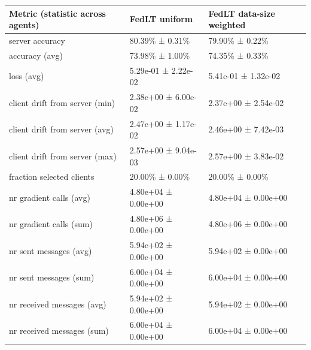 \begin{tabular}{lll}
\hline
 Metric (statistic across agents)   & FedLT uniform       & FedLT data-size weighted   \\
\hline
 server accuracy                    & 80.39\% ± 0.31\%      & 79.90\% ± 0.22\%             \\
 accuracy (avg)                     & 73.98\% ± 1.00\%      & 74.35\% ± 0.33\%             \\
 loss (avg)                         & 5.29e-01 ± 2.22e-02 & 5.41e-01 ± 1.32e-02        \\
 client drift from server (min)     & 2.38e+00 ± 6.00e-02 & 2.37e+00 ± 2.54e-02        \\
 client drift from server (avg)     & 2.47e+00 ± 1.17e-02 & 2.46e+00 ± 7.42e-03        \\
 client drift from server (max)     & 2.57e+00 ± 9.04e-03 & 2.57e+00 ± 3.83e-02        \\
 fraction selected clients          & 20.00\% ± 0.00\%      & 20.00\% ± 0.00\%             \\
 nr gradient calls (avg)            & 4.80e+04 ± 0.00e+00 & 4.80e+04 ± 0.00e+00        \\
 nr gradient calls (sum)            & 4.80e+06 ± 0.00e+00 & 4.80e+06 ± 0.00e+00        \\
 nr sent messages (avg)             & 5.94e+02 ± 0.00e+00 & 5.94e+02 ± 0.00e+00        \\
 nr sent messages (sum)             & 6.00e+04 ± 0.00e+00 & 6.00e+04 ± 0.00e+00        \\
 nr received messages (avg)         & 5.94e+02 ± 0.00e+00 & 5.94e+02 ± 0.00e+00        \\
 nr received messages (sum)         & 6.00e+04 ± 0.00e+00 & 6.00e+04 ± 0.00e+00        \\
\hline
\end{tabular}